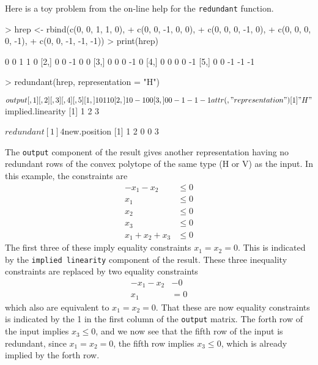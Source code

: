 \documentclass{article}
\begin{document}
Here is a toy problem from the on-line help for the \texttt{redundant}
function.
\begin{Schunk}
\begin{Sinput}
> hrep <- rbind(c(0, 0,  1,  1,  0),
+               c(0, 0, -1,  0,  0),
+               c(0, 0,  0, -1,  0),
+               c(0, 0,  0,  0, -1),
+               c(0, 0, -1, -1, -1))
> print(hrep)
\end{Sinput}
\begin{Soutput}
     [,1] [,2] [,3] [,4] [,5]
[1,]    0    0    1    1    0
[2,]    0    0   -1    0    0
[3,]    0    0    0   -1    0
[4,]    0    0    0    0   -1
[5,]    0    0   -1   -1   -1
\end{Soutput}
\begin{Sinput}
> redundant(hrep, representation = "H")
\end{Sinput}
\begin{Soutput}
$output
     [,1] [,2] [,3] [,4] [,5]
[1,]    1    0    1    1    0
[2,]    1    0   -1    0    0
[3,]    0    0   -1   -1   -1
attr(,"representation")
[1] "H"

$implied.linearity
[1] 1 2 3

$redundant
[1] 4

$new.position
[1] 1 2 0 0 3
\end{Soutput}
\end{Schunk}

The \texttt{output} component of the result gives another representation
having no redundant rows of the convex polytope of the same type (H or V)
as the input.  In this example, the constraints are
\begin{align*}
    - x_1 - x_2 & \le 0
    \\
    x_1 & \le 0
    \\
    x_2 & \le 0
    \\
    x_3 & \le 0
    \\
    x_1 + x_2 + x_3 & \le 0
\end{align*}
The first three of these imply equality constraints $x_1 = x_2 = 0$.
This is indicated by the \texttt{implied linearity} component of the result. 
These three inequality constraints are replaced by two equality constraints
\begin{align*}
    - x_1 - x_2 & - 0
    \\
    x_1 & = 0
\end{align*}
which also are equivalent to $x_1 = x_2 = 0$.  That these are now equality
constraints is indicated by the 1 in the first column of the \texttt{output}
matrix.  The forth row of the input implies $x_3 \le 0$, and we now see
that the fifth row of the input is redundant, since $x_1 = x_2 = 0$,
the fifth row implies $x_3 \le 0$, which is already implied by the forth row.
\end{document}
